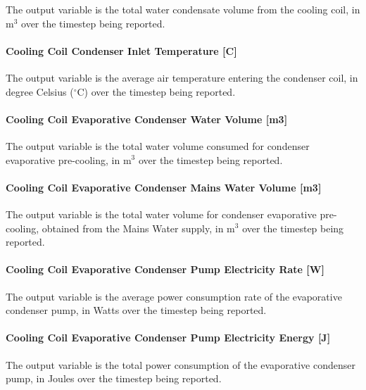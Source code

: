 The output variable is the total water condensate volume from the cooling coil, in m\(^{3}\) over the timestep being reported.

\paragraph{Cooling Coil Condenser Inlet Temperature {[}C{]}}\label{cooling-coil-condenser-inlet-temperature-c-1}

The output variable is the average air temperature entering the condenser coil, in degree Celsius ($^\circ$C) over the timestep being reported.

\paragraph{Cooling Coil Evaporative Condenser Water Volume {[}m3{]}}\label{cooling-coil-evaporative-condenser-water-volume-m3-1}

The output variable is the total water volume consumed for condenser evaporative pre-cooling, in m\(^{3}\) over the timestep being reported.

\paragraph{Cooling Coil Evaporative Condenser Mains Water Volume {[}m3{]}}\label{cooling-coil-evaporative-condenser-mains-water-volume-m3}

The output variable is the total water volume for condenser evaporative pre-cooling, obtained from the Mains Water supply, in m\(^{3}\) over the timestep being reported.

\paragraph{Cooling Coil Evaporative Condenser Pump Electricity Rate {[}W{]}}\label{cooling-coil-evaporative-condenser-pump-electric-powerw}

The output variable is the average power consumption rate of the evaporative condenser pump, in Watts over the timestep being reported.

\paragraph{Cooling Coil Evaporative Condenser Pump Electricity Energy {[}J{]}}\label{cooling-coil-evaporative-condenser-pump-electric-energy-j-1}

The output variable is the total power consumption of the evaporative condenser pump, in Joules over the timestep being reported.

